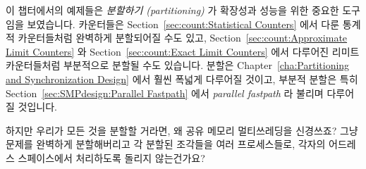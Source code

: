 이 챕터에서의 예제들은 \emph{분할하기 (partitioning)} 가 확장성과 성능을 위한
중요한 도구임을 보였습니다.
카운터들은 Section~\ref{sec:count:Statistical Counters} 에서 다룬 통계적
카운터들처럼 완벽하게 분할되어질 수도 있고, Section~\ref{sec:count:Approximate
Limit Counters} 와 Section~\ref{sec:count:Exact Limit Counters} 에서 다루어진
리미트 카운터들처럼 부분적으로 분할될 수도 있습니다.
분할은 Chapter~\ref{cha:Partitioning and Synchronization Design} 에서 훨씬
폭넓게 다루어질 것이고, 부분적 분할은 특히 Section~\ref{sec:SMPdesign:Parallel
Fastpath} 에서 \emph{parallel fastpath} 라 불리며 다루어질 것입니다.

\QuickQuiz{}
	하지만 우리가 모든 것을 분할할 거라면, 왜 공유 메모리 멀티쓰레딩을
	신경쓰죠?
	그냥 문제를 완벽하게 분할해버리고 각 분할된 조각들을 여러 프로세스들로,
	각자의 어드레스 스페이스에서 처리하도록 돌리지 않는건가요?
	\iffalse

